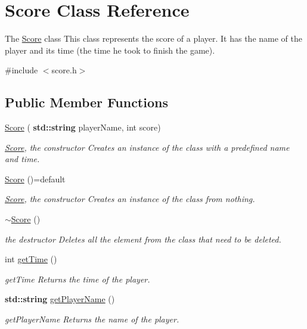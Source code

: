 \hypertarget{class_score}{}\section{Score Class Reference}
\label{class_score}


The \hyperlink{class_score}{Score} class This class represents the score of a player. It has the name of the player and its time (the time he took to finish the game).  




{\ttfamily \#include $<$score.\+h$>$}

\subsection*{Public Member Functions}
\begin{DoxyCompactItemize}
\item 
\hyperlink{class_score_af07252e30895cde501587fd0a692c42a}{Score} (\textbf{ std\+::string} player\+Name, int score)
\begin{DoxyCompactList}\small\item\em \hyperlink{class_score}{Score}, the constructor Creates an instance of the class with a predefined name and time. \end{DoxyCompactList}\item 
\mbox{\label{class_score_aa34a5054236b40a6de262f1251e05f2c}} 
\hyperlink{class_score_aa34a5054236b40a6de262f1251e05f2c}{Score} ()=default
\begin{DoxyCompactList}\small\item\em \hyperlink{class_score}{Score}, the constructor Creates an instance of the class from nothing. \end{DoxyCompactList}\item 
\mbox{\label{class_score_a54ab36a6fdd88696f0176d9534a76883}} 
\hyperlink{class_score_a54ab36a6fdd88696f0176d9534a76883}{$\sim$\+Score} ()
\begin{DoxyCompactList}\small\item\em the destructor Deletes all the element from the class that need to be deleted. \end{DoxyCompactList}\item 
int \hyperlink{class_score_a4976c3ddaf76725c3f37c0cec3dfeef6}{get\+Time} ()
\begin{DoxyCompactList}\small\item\em get\+Time Returns the time of the player. \end{DoxyCompactList}\item 
\textbf{ std\+::string} \hyperlink{class_score_ad254f42b5b7e74269836d801220d1a7a}{get\+Player\+Name} ()
\begin{DoxyCompactList}\small\item\em get\+Player\+Name Returns the name of the player. \end{DoxyCompactList}\end{DoxyCompactItemize}


